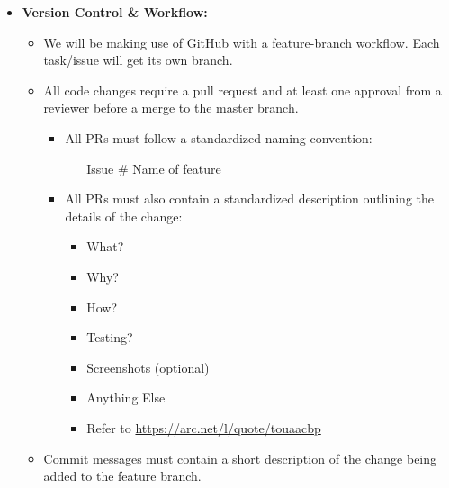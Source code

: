 \documentclass{article}
\begin{document}
\begin{itemize}
    \item \textbf{Version Control \& Workflow:}
    \begin{itemize}
        \item We will be making use of GitHub with a feature-branch workflow. Each task/issue will get its own branch.
        \item All code changes require a pull request and at least one approval from a reviewer before a merge to the master branch.
        \begin{itemize}
            \item All PRs must follow a standardized naming convention:
            \begin{itemize}
                \item [Issue \#] Name of feature
            \end{itemize}
            \item All PRs must also contain a standardized description outlining the details of the change:
            \begin{itemize}
                \item  What?
                \item  Why?
                \item  How?
                \item  Testing?
                \item  Screenshots (optional)
                \item  Anything Else
                \item Refer to \url{https://arc.net/l/quote/touaacbp}
            \end{itemize}
        \end{itemize}
        \item Commit messages must contain a short description of the change being added to the feature branch.
    \end{itemize}


\end{itemize}
\end{document}
